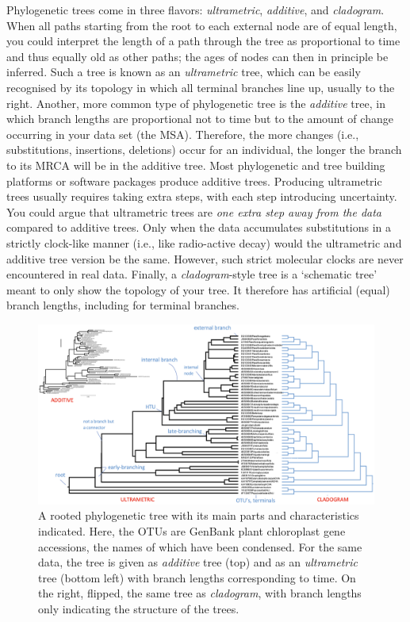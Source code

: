 Phylogenetic trees come in three flavors: \textit{ultrametric}, \textit{additive}, and \textit{cladogram}.
When all paths starting from the root to each external node are of equal length, you could interpret the length of a path through the tree as proportional to time and thus equally old as other paths; the ages of nodes can then in principle be inferred.
Such a tree is known as an \textit{ultrametric} tree, which can be easily recognised by its topology in which all terminal branches line up, usually to the right.
Another, more common type of phylogenetic tree is the \textit{additive} tree, in which branch lengths are proportional not to time but to the amount of change occurring in your data set (the MSA).
Therefore, the more changes (i.e., substitutions, insertions, deletions) occur for an individual, the longer the branch to its MRCA will be in the additive tree.
Most phylogenetic and tree building platforms or software packages produce additive trees.
Producing ultrametric trees usually requires taking extra steps, with each step introducing uncertainty.
You could argue that ultrametric trees are \textit{one extra step away from the data} compared to additive trees.
Only when the data accumulates substitutions in a strictly clock-like manner (i.e., like radio-active decay) would the ultrametric and additive tree version be the same.
However, such strict molecular clocks are never encountered in real data.
Finally, a \textit{cladogram}-style tree is a `schematic tree' meant to only show the topology of your tree.
It therefore has artificial (equal) branch lengths, including for terminal branches.

\begin{figure}[!htbp]
\centering
\includegraphics[width=1\linewidth]{files/tree-types-6565f30c28375a5d8adf5ad524b5b3db.png}
\caption[]{A rooted phylogenetic tree with its main parts and characteristics indicated.
Here, the OTUs are GenBank plant chloroplast gene accessions, the names of which have been condensed.
For the same data, the tree is given as \textit{additive} tree (top) and as an \textit{ultrametric} tree (bottom left) with branch lengths corresponding to time.
On the right, flipped, the same tree as \textit{cladogram}, with branch lengths only indicating the structure of the trees.}
\label{tree_types}
\end{figure}

